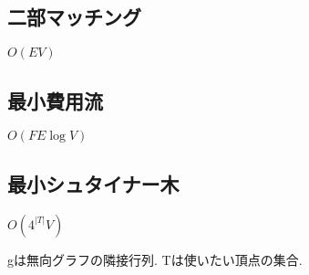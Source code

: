 \documentclass[10pt,twocolumn,a4j,landscape]{jsarticle}
\begin{document}
\subsection{二部マッチング}
$O(EV)$\par



\subsection{最小費用流}
$O(FE\log{V})$\par


\subsection{最小シュタイナー木}
$O(4^{|T|}V)$ \par
gは無向グラフの隣接行列. Tは使いたい頂点の集合.\par

\end{document}
